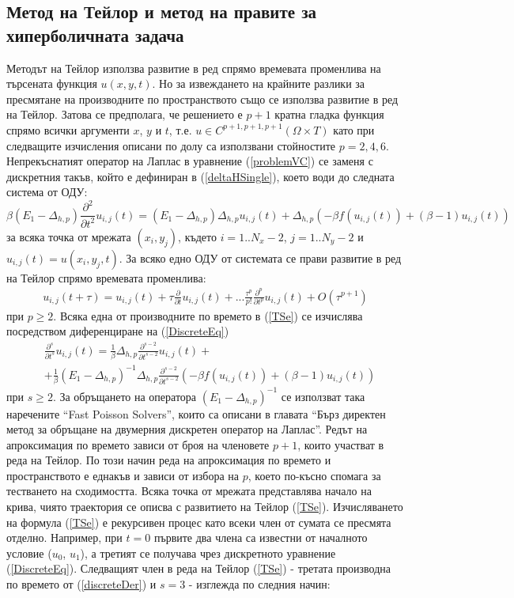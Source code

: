 \documentclass{article}
\newcommand{\be}{\begin{equation}}
\newcommand{\ee}{\end{equation}}
\newcommand{\rf}[1]{(\ref{#1})}
\theoremstyle{remark}
\begin{document}
\subsection{ Метод на Тейлор и метод на правите за хиперболичната задача}
Методът на Тейлор използва развитие в ред спрямо времевата променлива на търсената функция $u(x,y,t)$. Но за извеждането на крайните разлики за пресмятане на производните по пространството също се използва развитие в ред на Тейлор. Затова се предполага, че решението е $p+1$ кратна гладка функция спрямо всички аргументи $x$, $y$ и $t$, т.е. $u \in C^{p+1,p+1,p+1}(\Omega \times T)$ като при следващите изчисления описани по долу са използвани стойностите $p=2,4,6$. Непрекъснатият оператор на Лаплас в уравнение \rf{problemVC} се заменя с дискретния такъв, който е дефиниран в \rf{deltaHSingle}, което води до следната система от ОДУ:
\be \label{DiscreteEq}
\beta (E_1-\Delta_{h,p}) \frac{\partial^2 }{\partial t^2}u_{i, j}(t)=
 (E_1 - \Delta_{h,p})\Delta_{h,p} u_{i, j}(t) + \Delta_{h,p} ( -\beta f( u_{i, j}(t) ) + (\beta-1) u_{i, j}(t) )
\ee
за всяка точка от мрежата $(x_i, y_j)$, където $i = 1..N_x-2$, $j=1..N_y-2$ и $u_{i, j}(t) = u(x_i, y_j, t)$. За всяко едно ОДУ от системата се прави развитие в ред на Тейлор спрямо времевата променлива:
\begin{align} \label{TSe}
u_{i, j}(t+\tau) = u_{i, j}(t) + \tau \frac{ \partial }{ \partial t }u_{i, j}(t)  + ... 
\frac{ \tau^p }{ p! } \frac{ \partial^p}{ \partial t^p }u_{i, j}(t) + O(\tau^{p+1})
\end{align}
при $p \ge 2$. Всяка една от производните по времето в \rf{TSe} се изчислява посредством диференциране на \rf{DiscreteEq}
\begin{align}\label{discreteDer}
&\frac{\partial^s}{\partial t^s}u_{i, j}(t)= \frac{1}{\beta} \Delta_{h,p} \frac{\partial^{s-2}}{\partial t^{s-2}} u_{i, j}(t) + \nonumber \\ 
&+\frac{1}{\beta} (E_1-\Delta_{h,p})^{-1} \Delta_{h,p} \frac{\partial^{s-2}}{\partial t^{s-2}} ( -\beta f( u_{i, j}(t) ) + (\beta-1) u_{i, j}(t) ) 
\end{align}
при $s \ge 2$. За обръщането на оператора $(E_1-\Delta_{h,p})^{-1}$ се използват така наречените ``Fast Poisson Solvers'', които са описани в главата ``Бърз директен метод за обръщане на двумерния дискретен оператор на Лаплас''. Редът на апроксимация по времето зависи от броя на членовете $p+1$, които участват в реда на Тейлор. По този начин реда на апроксимация по времето и пространството е еднакъв и зависи от избора на $p$, което по-късно спомага за тестването на сходимостта. Всяка точка от мрежата представлява начало на крива, чиято траектория се описва с развитието на Тейлор \rf{TSe}. Изчисляването на формула \rf{TSe} е рекурсивен процес като всеки член от сумата се пресмята отделно. Например, при $t=0$ първите два члена са известни от началното условие ($u_0$, $u_1$), а третият се получава чрез дискретното уравнение \rf{DiscreteEq}.  Следващият член в реда на Тейлор \rf{TSe} - третата производна по времето от \rf{discreteDer} и $s=3$ - изглежда по следния начин:
\end{document}
